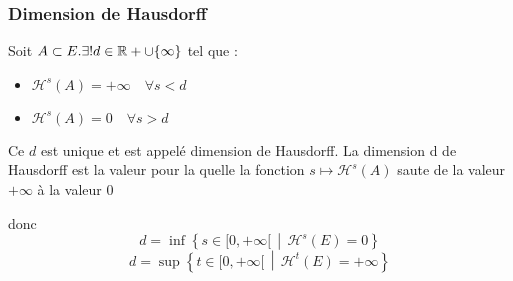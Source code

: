 \documentclass[12pt,a4paper]{report}
\theoremstyle{plain}
\theoremstyle{plain}
\theoremstyle{definition}
\theoremstyle{remark}
\newcommand{\enstq}[2]{\left\{#1\,\middle|\,#2\right\}}
\newcommand{\ensnombre}[1]{\mathbb{#1}}
\newcommand{\R}[1]{\ensnombre{R}}
\begin{document}
\subsubsection*{Dimension de Hausdorff}
Soit $A \subset E. \exists !d \in \R_+\cup \{\infty\}$ tel que :
\begin{itemize}
\item $\mathcal{H}^s(A) = + \infty \quad \forall s<d$
\item $\mathcal{H}^s(A)=0 \quad \forall s>d$
\end{itemize}
Ce $d$ est unique et est appelé dimension de Hausdorff. La dimension d de Hausdorff est la valeur pour la quelle la fonction $s \mapsto \mathcal{H}^s(A)$ saute de la valeur $+ \infty$ à la valeur $0$

donc 
\[d = \inf \enstq{s \in [0, +\infty[}{\mathcal{H}^s(E)=0}\]
\[d = \sup \enstq{t \in [0, +\infty[}{\mathcal{H}^t(E)=+\infty}\]
\end{document}
